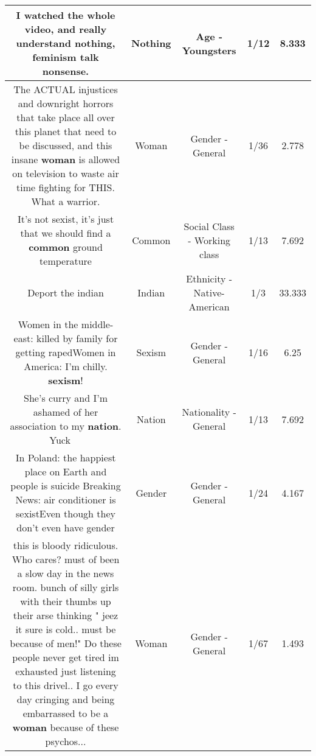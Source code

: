 \documentclass[11pt]{article}
\newlength\mylength
\begin{document}
\begin{center}
\begin{longtable}{|C{.65\mylength}|C{.30\mylength}|C{.12\mylength}|C{.12\mylength}|C{.12\mylength}|}
  \small I watched the whole video, and really understand \textbf{nothing}, feminism talk nonsense.\normalsize   & Nothing & Age - Youngsters & 1/12 & 8.333 \\  \hline
  \small The ACTUAL injustices and downright horrors that take place all over this planet that need to be discussed, and this insane \textbf{woman} is allowed on television to waste air time fighting for THIS. What a warrior.\normalsize   & Woman & Gender - General & 1/36 & 2.778 \\  \hline
  \small It's not sexist, it's just that we should find a \textbf{common} ground temperature\normalsize   & Common & Social Class - Working class & 1/13 & 7.692 \\  \hline
  \small Deport the indian\normalsize   & Indian & Ethnicity - Native-American & 1/3 & 33.333 \\  \hline
  \small Women in the middle-east: killed by family for getting rapedWomen in America: I'm chilly. \textbf{sexism}!\normalsize   & Sexism & Gender - General & 1/16 & 6.25 \\  \hline
  \small She's curry and I'm ashamed of her association to my \textbf{nation}. Yuck 🤦‍♂️🥴\normalsize   & Nation & Nationality - General & 1/13 & 7.692 \\  \hline
  \small In Poland: the happiest place on Earth and people is suicide Breaking News: air conditioner is sexistEven though they don't even have gender\normalsize   & Gender & Gender - General & 1/24 & 4.167 \\  \hline
  \small this is bloody ridiculous. Who cares? must of been a slow day in the news room. bunch of silly girls with their thumbs up their arse thinking " jeez it sure is cold.. must be because of men!" Do these people never get tired im exhausted just listening to this drivel.. I go every day cringing and being embarrassed to be a \textbf{woman} because of these psychos...\normalsize   & Woman & Gender - General & 1/67 & 1.493 \\  \hline

\end{longtable}
\end{center}
\end{document}
